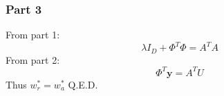 \documentclass{article}
\begin{document}
\subsubsection{Part 3}
From part 1:
\begin{equation}
    \lambda I_D + \Phi^T\Phi = A^TA    
\end{equation}
From part 2: 
\begin{equation}
    \Phi^T\mathbf{y} = A^TU
\end{equation}
Thus $w_r^*=w_a^*$ Q.E.D.
\end{document}
